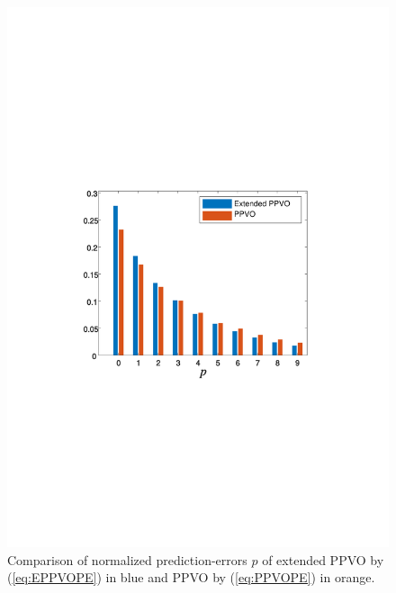\documentclass[review,3p,10pt,sort&compress]{elsarticle}
\begin{document}
\begin{figure}
{\begin{minipage}[t]{0.225\linewidth}
    \includegraphics[width=1\textwidth]{figures/Comparison/elaine.pdf}
    \end{minipage}
}
\centering
\caption{Comparison of normalized prediction-errors $p$ of extended PPVO by (\ref{eq:EPPVOPE}) in blue and PPVO by (\ref{eq:PPVOPE}) in orange.}
\label{Fig.ComparisonEPPVO}
\end{figure}
\end{document}
